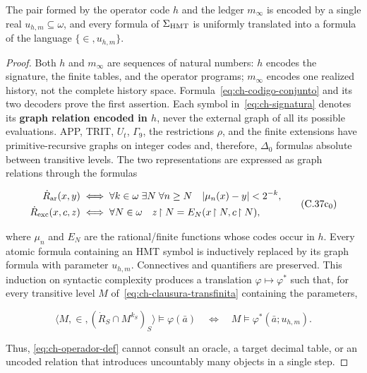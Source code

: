 \begin{lemma}
\label{thm:ch-6}
The pair formed by the operator code \(h\) and the ledger \(m_\infty\) is
encoded by a single real \(u_{h,m}\subseteq\omega\), and every formula of
\(\Sigma_{\rm HMT}\) is uniformly translated into a formula of the language
\(\{\in,u_{h,m}\}\).

\end{lemma}
\begin{proof}
Both \(h\) and \(m_\infty\) are sequences of natural numbers: \(h\) encodes
the signature, the finite tables, and the operator programs; \(m_\infty\)
encodes one realized history, not the complete history space.
Formula~\eqref{eq:ch-codigo-conjunto} and its two decoders prove the first
assertion. Each symbol in~\eqref{eq:ch-signatura} denotes its \textbf{graph
relation encoded in \(h\)}, never the external graph of all its possible
evaluations. APP, TRIT, \(U_t\), \(\Gamma_9\), the restrictions \(\rho\), and
the finite extensions have primitive-recursive graphs on integer codes and,
therefore, \(\Delta_0\) formulas absolute between transitive levels. The two
representations are expressed as graph relations through the formulas

\[
 \begin{aligned}
 \dot R_{\rm ar}(x,y)
 &\;\Longleftrightarrow\;
 \forall k\in\omega\;\exists N\;\forall n\ge N\quad
 |\mu_n(x)-y|<2^{-k},\\
 \dot R_{\rm exc}(x,c,z)
 &\;\Longleftrightarrow\;
 \forall N\in\omega\quad z\!\upharpoonright N
   =E_N(x\!\upharpoonright N,c\!\upharpoonright N),
 \end{aligned}
\tag{C.37c$_0$}\label{eq:ch-grafos-publicacion}
\]

where \(\mu_n\) and \(E_N\) are the rational/finite functions whose codes
occur in \(h\). Every atomic formula containing an HMT symbol is inductively
replaced by its graph formula with parameter \(u_{h,m}\). Connectives and
quantifiers are preserved. This induction on syntactic complexity produces a
translation \(\varphi\mapsto\varphi^*\) such that, for every transitive level
\(M\) of~\eqref{eq:ch-clausura-transfinita} containing the parameters,

\[
 \langle M,\in,(\dot R_S\cap M^{k_S})_S\rangle
   \models\varphi(\bar a)
 \quad\Longleftrightarrow\quad
 M\models\varphi^*(\bar a;u_{h,m}).
\tag{C.37c}\label{eq:ch-eliminacion-uniforme}
\]

Thus, \eqref{eq:ch-operador-def} cannot consult an oracle, a target decimal
table, or an uncoded relation that introduces uncountably many objects in a
single step.
\end{proof}

